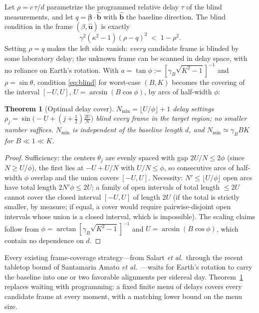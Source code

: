 \documentclass[10pt,twocolumn]{article}
\newtheorem{theorem}{Theorem}
\begin{document}
Let $\rho = c\,\tau/d$ parametrize the programmed relative delay $\tau$ of the blind measurements, and let $q=\boldsymbol\beta\cdot\hat{\mathbf b}$ with $\hat{\mathbf b}$ the baseline direction. The blind condition in the frame $(\beta,\hat{\mathbf u})$ is exactly
\begin{equation}
\gamma^2(\kappa^2-1)(\rho-q)^2 \;<\; 1-\rho^2 .
\label{eq:blind}
\end{equation}
Setting $\rho=q$ makes the left side vanish: \emph{every} candidate frame is blinded by some laboratory delay; the unknown frame can be scanned in delay space, with no reliance on Earth's rotation. With $a = \tan\phi := [\gamma_B\sqrt{K^2-1}]^{-1}$ and $\rho=\sin\theta$, condition \eqref{eq:blind} for worst-case $(B,K)$ becomes the covering of the interval $[-U,U]$, $U=\arcsin(B\cos\phi)$, by arcs of half-width $\phi$:

\begin{theorem}[Optimal delay cover]
\label{thm:cover}
$N_{\min} = \lfloor U/\phi\rfloor + 1$ delay settings $\rho_j = \sin\big({-}U + (j+\tfrac12)\tfrac{2U}{N}\big)$ blind every frame in the target region; no smaller number suffices. $N_{\min}$ is independent of the baseline length $d$, and $N_{\min}\simeq \gamma_B B K$ for $B\ll1\ll K$.
\end{theorem}

\begin{proof}
Sufficiency: the centers $\theta_j$ are evenly spaced with gap $2U/N \le 2\phi$ (since $N \ge U/\phi$), the first lies at $-U+U/N$ with $U/N \le \phi$, so consecutive arcs of half-width $\phi$ overlap and the union covers $[-U,U]$. Necessity: $N' \le \lfloor U/\phi\rfloor$ open arcs have total length $2N'\phi \le 2U$; a family of open intervals of total length $\le 2U$ cannot cover the closed interval $[-U,U]$ of length $2U$ (if the total is strictly smaller, by measure; if equal, a cover would require pairwise-disjoint open intervals whose union is a closed interval, which is impossible). The scaling claims follow from $\phi=\arctan[\gamma_B\sqrt{K^2-1}]^{-1}$ and $U=\arcsin(B\cos\phi)$, which contain no dependence on $d$.
\end{proof}

Every existing frame-coverage strategy---from Salart \emph{et al.}\ through the recent tabletop bound of Santamaria Amato \emph{et al.}~\cite{Salart2008,Cocciaro2018,Slussarenko2023}---waits for Earth's rotation to carry the baseline into one or two favorable alignments per sidereal day. Theorem~\ref{thm:cover} replaces waiting with programming: a fixed finite menu of delays covers every candidate frame at every moment, with a matching lower bound on the menu size.
\end{document}
